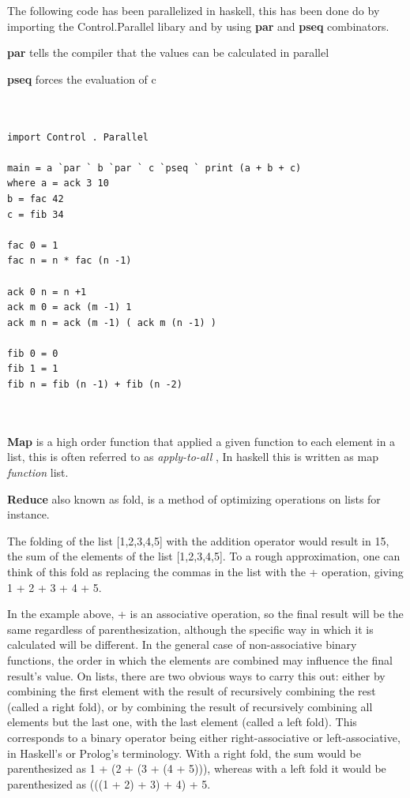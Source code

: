 \documentclass[a4paper,oneside]{report}
\begin{document}
The following code has been parallelized in haskell, this has been done do by importing the Control.Parallel libary and by using \textbf{par} and \textbf{pseq} combinators. 

\textbf{par} tells the compiler that the values can be calculated in parallel

\textbf{pseq} forces the evaluation of c 


\begin{lstlisting}[label=some-code,caption=Parallel code in haskell] 


import Control . Parallel

main = a `par ` b `par ` c `pseq ` print (a + b + c)
where a = ack 3 10
b = fac 42
c = fib 34

fac 0 = 1
fac n = n * fac (n -1)

ack 0 n = n +1
ack m 0 = ack (m -1) 1
ack m n = ack (m -1) ( ack m (n -1) )

fib 0 = 0
fib 1 = 1
fib n = fib (n -1) + fib (n -2)



\end{lstlisting}



			\textbf{Map} is a high order function that applied a given function to each element in a list, this is often referred to as \emph{apply-to-all} , In haskell this is written as map \emph{function} list.



			\textbf{Reduce} also known as fold, is a method of optimizing operations on lists for instance. 

			The folding of the list [1,2,3,4,5] with the addition operator would result in 15, the sum of the elements of the list [1,2,3,4,5]. To a rough approximation, one can think of this fold as replacing the commas in the list with the + operation, giving 1 + 2 + 3 + 4 + 5.

			In the example above, + is an associative operation, so the final result will be the same regardless of parenthesization, although the specific way in which it is calculated will be different. In the general case of non-associative binary functions, the order in which the elements are combined may influence the final result's value. On lists, there are two obvious ways to carry this out: either by combining the first element with the result of recursively combining the rest (called a right fold), or by combining the result of recursively combining all elements but the last one, with the last element (called a left fold). This corresponds to a binary operator being either right-associative or left-associative, in Haskell's or Prolog's terminology. With a right fold, the sum would be parenthesized as 1 + (2 + (3 + (4 + 5))), whereas with a left fold it would be parenthesized as (((1 + 2) + 3) + 4) + 5.
\end{document}

